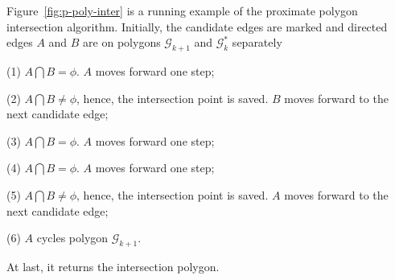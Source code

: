 \begin{example}
Figure~\ref{fig:p-poly-inter} is a running example of the proximate polygon intersection algorithm.
Initially, the candidate edges are marked and directed edges $A$ and $B$ are on polygons $\mathcal{G}_{k+1}$ and $\mathcal{G}^*_{k}$ separately

\ni (1) $A \bigcap B = \phi$. $A$ moves forward one step;

\ni (2) $A \bigcap B \ne \phi$, hence, the intersection point is saved. $B$ moves forward to the next candidate edge;

\ni (3) $A \bigcap B = \phi$. $A$ moves forward one step;

\ni (4) $A \bigcap B = \phi$. $A$ moves forward one step;

\ni (5) $A \bigcap B \ne \phi$, hence, the intersection point is saved. $A$ moves forward to the next candidate edge;

\ni (6) $A$ cycles polygon $\mathcal{G}_{k+1}$.

At last, it returns the intersection polygon.
\end{example}
